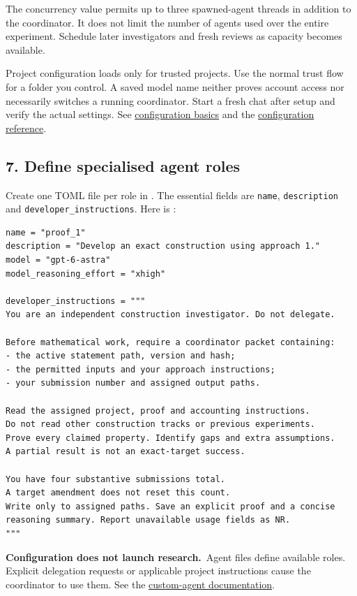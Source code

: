 \documentclass[11pt,a4paper]{article}
\newcommand{\pathcode}[1]{\texttt{\small\detokenize{#1}}}
\newcommand{\note}[2]{\par\smallskip\noindent\colorbox{paperblue}{\parbox{\dimexpr\linewidth-2\fboxsep\relax}{\textbf{#1}\ #2}}\par\smallskip}
\begin{document}
The concurrency value permits up to three spawned-agent threads in addition to the coordinator. It does not limit the number of agents used over the entire experiment. Schedule later investigators and fresh reviews as capacity becomes available.

Project configuration loads only for trusted projects. Use the normal trust flow for a folder you control. A saved model name neither proves account access nor necessarily switches a running coordinator. Start a fresh chat after setup and verify the actual settings. See \href{https://learn.chatgpt.com/docs/config-file/config-basic}{configuration basics} and the \href{https://learn.chatgpt.com/docs/config-file/config-reference}{configuration reference}.

\subsection*{7. Define specialised agent roles}
Create one TOML file per role in \pathcode{.codex/agents/}. The essential fields are \texttt{name}, \texttt{description} and \texttt{developer\_instructions}. Here is \pathcode{proof_1.toml}:
\begin{lstlisting}
name = "proof_1"
description = "Develop an exact construction using approach 1."
model = "gpt-6-astra"
model_reasoning_effort = "xhigh"

developer_instructions = """
You are an independent construction investigator. Do not delegate.

Before mathematical work, require a coordinator packet containing:
- the active statement path, version and hash;
- the permitted inputs and your approach instructions;
- your submission number and assigned output paths.

Read the assigned project, proof and accounting instructions.
Do not read other construction tracks or previous experiments.
Prove every claimed property. Identify gaps and extra assumptions.
A partial result is not an exact-target success.

You have four substantive submissions total.
A target amendment does not reset this count.
Write only to assigned paths. Save an explicit proof and a concise
reasoning summary. Report unavailable usage fields as NR.
"""
\end{lstlisting}

\note{Configuration does not launch research.}{Agent files define available roles. Explicit delegation requests or applicable project instructions cause the coordinator to use them. See the \href{https://learn.chatgpt.com/docs/agent-configuration/subagents}{custom-agent documentation}.}
\newpage
\end{document}
